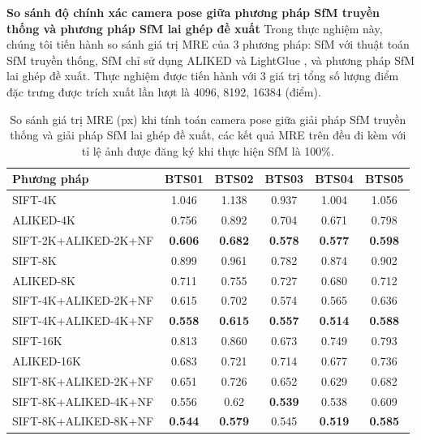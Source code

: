\textbf{So sánh độ chính xác camera pose giữa phương pháp SfM truyền thống và phương pháp SfM lai ghép đề xuất}
Trong thực nghiệm này, chúng tôi tiến hành so sánh giá trị MRE của 3 phương pháp: SfM với thuật toán SfM truyền thống, SfM chỉ sử dụng ALIKED \cite{zhao2023aliked} và LightGlue \cite{lindenberger2023LightGlue}, và phương pháp SfM lai ghép đề xuất. Thực nghiệm được tiến hành với 3 giá trị tổng số lượng điểm đặc trưng được trích xuất lần lượt là 4096, 8192, 16384 (điểm).
    \begin{table}[H]
    \centering
    \footnotesize
    \begin{tabular}{|l|c|c|c|c|c|}
    \hline
    \textbf{Phương pháp} & \textbf{BTS01} & \textbf{BTS02} & \textbf{BTS03} & \textbf{BTS04} & \textbf{BTS05} \\
    \hline
    SIFT-4K & 1.046 & 1.138 & 0.937 & 1.004 & 1.056 \\
    ALIKED-4K & 0.756 & 0.892 & 0.704 & 0.671 & 0.798 \\
    SIFT-2K+ALIKED-2K+NF & \textbf{0.606} & \textbf{0.682} & \textbf{0.578} & \textbf{0.577} & \textbf{0.598} \\
    \hline
    SIFT-8K & 0.899 & 0.961 & 0.782 & 0.874 & 0.902 \\
    ALIKED-8K & 0.711 & 0.755 & 0.727 & 0.680 & 0.712 \\
    SIFT-4K+ALIKED-2K+NF & 0.615 & 0.702 & 0.574 & 0.565 & 0.636 \\
    SIFT-4K+ALIKED-4K+NF & \textbf{0.558} & \textbf{0.615} & \textbf{0.557} & \textbf{0.514} & \textbf{0.588} \\
    \hline
    SIFT-16K & 0.813 & 0.860 & 0.673 & 0.749 & 0.793\\
    ALIKED-16K & 0.683 & 0.721 & 0.714 & 0.677 & 0.736 \\
    SIFT-8K+ALIKED-2K+NF & 0.651 & 0.726 & 0.652 & 0.629 & 0.682 \\
    SIFT-8K+ALIKED-4K+NF & 0.556 & 0.62 & \textbf{0.539} & 0.538 & 0.609 \\
    SIFT-8K+ALIKED-8K+NF & \textbf{0.544} & \textbf{0.579} & 0.545 & \textbf{0.519} & \textbf{0.585} \\ 
    \hline
    \end{tabular}
    \caption{So sánh giá trị MRE (px) khi tính toán camera pose giữa giải pháp SfM truyền thống và giải pháp SfM lai ghép đề xuất, các kết quả MRE trên đều đi kèm với tỉ lệ ảnh được đăng ký khi thực hiện SfM là 100\%.}
    \label{tab:comparison}
    \end{table}

